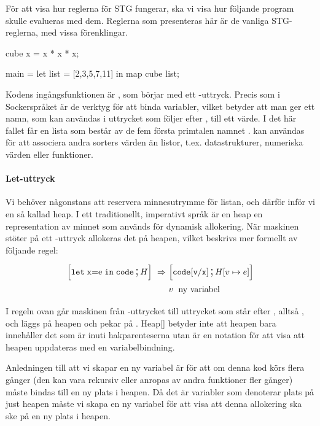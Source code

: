 \documentclass[../Core]{subfiles}
\begin{document}
För att visa hur reglerna
för STG  fungerar, ska vi visa hur följande program skulle evalueras med dem.
Reglerna som presenteras här är de vanliga STG-reglerna\cite{marlow2006making},
med vissa förenklingar.

\begin{codeEx}
cube x = x * x * x;

main = let list = [2,3,5,7,11]
        in map cube list;
\end{codeEx}

Kodens ingångsfunktionen är , som börjar med ett -uttryck.
Precis som i Sockerspråket är de verktyg för att binda variabler, vilket betyder att man ger ett
namn, som kan användas i uttrycket som följer efter ,
till ett värde. I det här fallet får
en lista som består av de fem första primtalen namnet .
 kan användas för att associera andra sorters värden än listor,
t.ex. datastrukturer, numeriska värden eller funktioner.

\paragraph{Let-uttryck} Vi behöver någonstans att reservera minnesutrymme för listan, och därför
inför vi en så kallad heap. I ett traditionellt, imperativt språk är
en heap en representation av minnet som används för dynamisk allokering. När
maskinen stöter på ett -uttryck allokeras det på heapen, vilket
beskrivs mer formellt av följande regel:

\begin{align*}
\text{\large$$}\Big[\mathtt{let\;\mathrm{x\mathtt{=}e}\; in\; code} \,\text{\Large;}\, H\Big]\,\,\Rightarrow\,\, & \text{\large$$}\Big[\mathtt{code[v/x]} \,\text{\Large;}\, H[v\mapsto e]\Big] \\
 & v\; \text{ ny variabel} \nonumber
\end{align*}

I regeln ovan går maskinen från -uttrycket till
uttrycket som står efter , alltså ,
och  läggs på heapen och pekar på .
Heap{[}{]} betyder inte att heapen bara innehåller det som är inuti
hakparenteserna utan är en notation för att visa att heapen
uppdateras med en variabelbindning.

Anledningen till att vi skapar en ny variabel  är för att om
denna kod körs flera gånger (den kan vara rekursiv eller anropas av andra funktioner
fler gånger) måste  bindas till en ny plats i heapen. Då det är variabler som
denoterar plats på just heapen måste vi skapa en ny variabel för att visa att denna
allokering ska ske på en ny plats i heapen.
\end{document}
